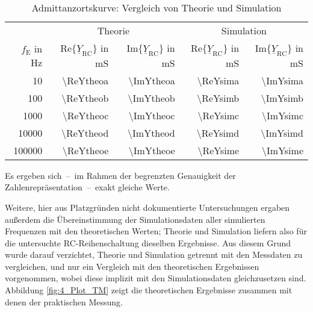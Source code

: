 \begin{table}[H]
  \centering
	\caption{Admittanzortskurve: Vergleich von Theorie und Simulation}
	\label{tab:4_YTS}
	\renewcommand*{\arraystretch}{1.25}
	\begin{tabular}{rrrrr}
	  \toprule
	  \multicolumn{1}{c}{} &
		\multicolumn{2}{c}{Theorie} &
		\multicolumn{2}{c}{Simulation} \\
		\cmidrule(lr{1mm}){2-3}\cmidrule(lr{1mm}){4-5}
    $f_\mathrm{E}$ in \si{\hertz} &
    $\text{Re}\{\underline{Y}_\mathrm{RC}\}$ in \si{\milli\siemens} &
    $\text{Im}\{\underline{Y}_\mathrm{RC}\}$ in \si{\milli\siemens} &
    $\text{Re}\{\underline{Y}_\mathrm{RC}\}$ in \si{\milli\siemens} &
    $\text{Im}\{\underline{Y}_\mathrm{RC}\}$ in \si{\milli\siemens} \\
		\midrule
    \num{10}     & \num{\ReYtheoa} & \num{\ImYtheoa} & \num{\ReYsima} & \num{\ImYsima} \\
    \num{100}    & \num{\ReYtheob} & \num{\ImYtheob} & \num{\ReYsimb} & \num{\ImYsimb} \\
    \num{1000}   & \num{\ReYtheoc} & \num{\ImYtheoc} & \num{\ReYsimc} & \num{\ImYsimc} \\
    \num{10000}  & \num{\ReYtheod} & \num{\ImYtheod} & \num{\ReYsimd} & \num{\ImYsimd} \\
    \num{100000} & \num{\ReYtheoe} & \num{\ImYtheoe} & \num{\ReYsime} & \num{\ImYsime} \\
		\bottomrule
	\end{tabular}
\end{table}
%
Es ergeben sich~--~im Rahmen der begrenzten Genauigkeit der Zahlenrepräsentation~--~exakt gleiche Werte.
\par
Weitere, hier aus Platzgründen nicht dokumentierte Untersuchungen ergaben außerdem die Übereinstimmung der Simulationsdaten aller simulierten Frequenzen mit den theoretischen Werten; Theorie und Simulation liefern also für die untersuchte RC-Reihenschaltung dieselben Ergebnisse. Aus diesem Grund wurde darauf verzichtet, Theorie und Simulation getrennt mit den Messdaten zu vergleichen, und nur ein Vergleich mit den theoretischen Ergebnissen vorgenommen, wobei diese implizit mit den Simulationsdaten gleichzusetzen sind.
\newpage
Abbildung \ref{fig:4_Plot_TM} zeigt die theoretischen Ergebnisse zusammen mit denen der praktischen Messung.
%

